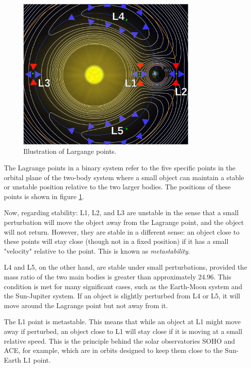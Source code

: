 \documentclass{article}
\begin{document}
\begin{figure}
    \centering
    \includegraphics[width=0.8\textwidth]{images/1056px-Lagrange_points2.svg.png}
    \caption{Illustration of Largange points.}
    \label{fig:Lagraange points}
\end{figure}

The Lagrange points in a binary system refer to the five specific points in the orbital plane of the two-body system where a small object can maintain a stable or unstable position relative to the two larger bodies. The positions of these points is shown in figure \ref{fig:Lagraange points}.

Now, regarding stability: L1, L2, and L3 are unstable in the sense that a small perturbation will move the object away from the Lagrange point, and the object will not return. However, they are stable in a different sense: an object close to these points will stay close (though not in a fixed position) if it has a small "velocity" relative to the point. This is known as \emph{metastability}.

L4 and L5, on the other hand, are stable under small perturbations, provided the mass ratio of the two main bodies is greater than approximately 24.96. This condition is met for many significant cases, such as the Earth-Moon system and the Sun-Jupiter system. If an object is slightly perturbed from L4 or L5, it will move around the Lagrange point but not away from it.

The L1 point is metastable. This means that while an object at L1 might move away if perturbed, an object close to L1 will stay close if it is moving at a small relative speed. This is the principle behind the solar observatories SOHO and ACE, for example, which are in orbits designed to keep them close to the Sun-Earth L1 point.
\end{document}
